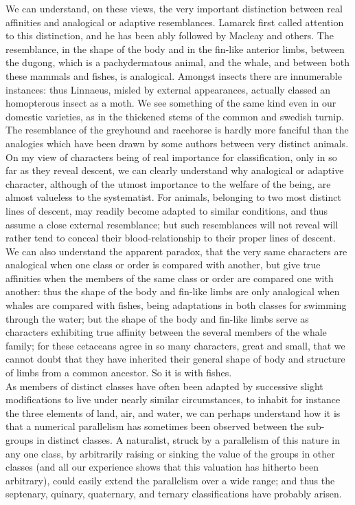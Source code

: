\indent We can understand, on these views, the very important distinction between real affinities and analogical or adaptive resemblances. Lamarck first called attention to this distinction, and he has been ably followed by Macleay and others. The resemblance, in the shape of the body and in the fin-like anterior limbs, between the dugong, which is a pachydermatous animal, and the whale, and between both these mammals and fishes, is analogical. Amongst insects there are innumerable instances: thus Linnaeus, misled by external appearances, actually classed an homopterous insect as a moth. We see something of the same kind even in our domestic varieties, as in the thickened stems of the common and swedish turnip. The resemblance of the greyhound and racehorse is hardly more fanciful than the analogies which have been drawn by some authors between very distinct animals. On my view of characters being of real importance for classification, only in so far as they reveal descent, we can clearly understand why analogical or adaptive character, although of the utmost importance to the welfare of the being, are almost valueless to the systematist. For animals, belonging to two most distinct lines of descent, may readily become adapted to similar conditions, and thus assume a close external resemblance; but such resemblances will not reveal will rather tend to conceal their blood-relationship to their proper lines of descent. We can also understand the apparent paradox, that the very same characters are analogical when one class or order is compared with another, but give true affinities when the members of the same class or order are compared one with another: thus the shape of the body and fin-like limbs are only analogical when whales are compared with fishes, being adaptations in both classes for swimming through the water; but the shape of the body and fin-like limbs serve as characters exhibiting true affinity between the several members of the whale family; for these cetaceans agree in so many characters, great and small, that we cannot doubt that they have inherited their general shape of body and structure of limbs from a common ancestor. So it is with fishes.~\\
\indent As members of distinct classes have often been adapted by successive slight modifications to live under nearly similar circumstances, to inhabit for instance the three elements of land, air, and water, we can perhaps understand how it is that a numerical parallelism has sometimes been observed between the sub-groups in distinct classes. A naturalist, struck by a parallelism of this nature in any one class, by arbitrarily raising or sinking the value of the groups in other classes (and all our experience shows that this valuation has hitherto been arbitrary), could easily extend the parallelism over a wide range; and thus the septenary, quinary, quaternary, and ternary classifications have probably arisen.~\\
